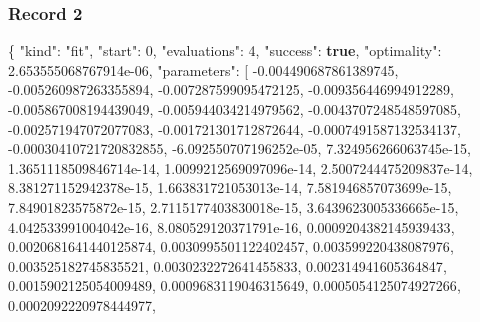 \documentclass[
  10pt,
]{article}
\newenvironment{Shaded}{}{}
\newcommand{\DataTypeTok}[1]{\textcolor[rgb]{0.56,0.13,0.00}{#1}}
\newcommand{\DecValTok}[1]{\textcolor[rgb]{0.25,0.63,0.44}{#1}}
\newcommand{\FloatTok}[1]{\textcolor[rgb]{0.25,0.63,0.44}{#1}}
\newcommand{\FunctionTok}[1]{\textcolor[rgb]{0.02,0.16,0.49}{#1}}
\newcommand{\KeywordTok}[1]{\textcolor[rgb]{0.00,0.44,0.13}{\textbf{#1}}}
\newcommand{\OtherTok}[1]{\textcolor[rgb]{0.00,0.44,0.13}{#1}}
\newcommand{\StringTok}[1]{\textcolor[rgb]{0.25,0.44,0.63}{#1}}
\begin{document}
\hypertarget{record-2-2}{%
\subsubsection{Record 2}\label{record-2-2}}

\begin{Shaded}
\begin{Highlighting}[]
\FunctionTok{\{}
  \DataTypeTok{"kind"}\FunctionTok{:} \StringTok{"fit"}\FunctionTok{,}
  \DataTypeTok{"start"}\FunctionTok{:} \DecValTok{0}\FunctionTok{,}
  \DataTypeTok{"evaluations"}\FunctionTok{:} \DecValTok{4}\FunctionTok{,}
  \DataTypeTok{"success"}\FunctionTok{:} \KeywordTok{true}\FunctionTok{,}
  \DataTypeTok{"optimality"}\FunctionTok{:} \FloatTok{2.653555068767914e{-}06}\FunctionTok{,}
  \DataTypeTok{"parameters"}\FunctionTok{:} \OtherTok{[}
    \FloatTok{{-}0.004490687861389745}\OtherTok{,}
    \FloatTok{{-}0.005260987263355894}\OtherTok{,}
    \FloatTok{{-}0.007287599095472125}\OtherTok{,}
    \FloatTok{{-}0.009356446994912289}\OtherTok{,}
    \FloatTok{{-}0.005867008194439049}\OtherTok{,}
    \FloatTok{{-}0.005944034214979562}\OtherTok{,}
    \FloatTok{{-}0.0043707248548597085}\OtherTok{,}
    \FloatTok{{-}0.002571947072077083}\OtherTok{,}
    \FloatTok{{-}0.001721301712872644}\OtherTok{,}
    \FloatTok{{-}0.0007491587132534137}\OtherTok{,}
    \FloatTok{{-}0.00030410721720832855}\OtherTok{,}
    \FloatTok{{-}6.092550707196252e{-}05}\OtherTok{,}
    \FloatTok{7.324956266063745e{-}15}\OtherTok{,}
    \FloatTok{1.3651118509846714e{-}14}\OtherTok{,}
    \FloatTok{1.0099212569097096e{-}14}\OtherTok{,}
    \FloatTok{2.5007244475209837e{-}14}\OtherTok{,}
    \FloatTok{8.381271152942378e{-}15}\OtherTok{,}
    \FloatTok{1.663831721053013e{-}14}\OtherTok{,}
    \FloatTok{7.581946857073699e{-}15}\OtherTok{,}
    \FloatTok{7.84901823575872e{-}15}\OtherTok{,}
    \FloatTok{2.7115177403830018e{-}15}\OtherTok{,}
    \FloatTok{3.6439623005336665e{-}15}\OtherTok{,}
    \FloatTok{4.042533991004042e{-}16}\OtherTok{,}
    \FloatTok{8.080529120371791e{-}16}\OtherTok{,}
    \FloatTok{0.0009204382145939433}\OtherTok{,}
    \FloatTok{0.0020681641440125874}\OtherTok{,}
    \FloatTok{0.0030995501122402457}\OtherTok{,}
    \FloatTok{0.003599220438087976}\OtherTok{,}
    \FloatTok{0.003525182745835521}\OtherTok{,}
    \FloatTok{0.0030232272641455833}\OtherTok{,}
    \FloatTok{0.002314941605364847}\OtherTok{,}
    \FloatTok{0.0015902125054009489}\OtherTok{,}
    \FloatTok{0.0009683119046315649}\OtherTok{,}
    \FloatTok{0.0005054125074927266}\OtherTok{,}
    \FloatTok{0.0002092220978444977}\OtherTok{,}

\end{Highlighting}
\end{Shaded}
\end{document}
